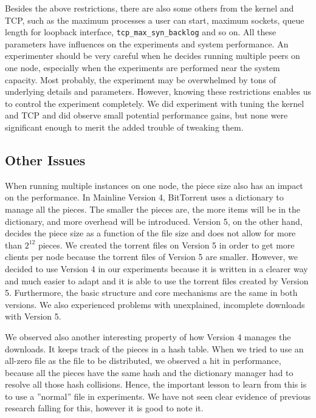 \documentclass[10pt,letterpaper,twocolumn]{article}
\begin{document}
Besides the above restrictions, there are also some others from the
kernel and TCP, such as the maximum processes a user can start,
maximum sockets, queue length for loopback interface,
\texttt{tcp\_max\_syn\_backlog} and so on. All these parameters have influences
on the experiments and system performance. An experimenter should be
very careful when he decides running multiple peers on one node,
especially when the experiments are performed near the system
capacity. Most probably, the experiment may be overwhelmed by tons of
underlying details and parameters. However, knowing these restrictions
enables us to control the experiment completely. We did experiment
with tuning the kernel and TCP and did observe small potential
performance gains, but none were significant enough to merit the added
trouble of tweaking them.






\subsection{Other Issues}
\label{sec:other-issues}


When running multiple instances on one node, the piece size also has
an impact on the performance. In Mainline Version 4, BitTorrent uses a
dictionary to manage all the pieces. The smaller the pieces are, the
more items will be in the dictionary, and more overhead will be
introduced. Version 5, on the other hand, decides the piece size as a
function of the file size and does not allow for more than $2^{12}$
pieces. We created the torrent files on Version 5 in order to get more
clients per node because the torrent files of Version 5 are
smaller. However, we decided to use Version 4 in our experiments
because it is written in a clearer way and much easier to adapt and it
is able to use the torrent files created by Version 5. Furthermore,
the basic structure and core mechanisms are the same in both
versions. We also experienced problems with unexplained, incomplete
downloads with Version 5.















We observed also another interesting property of how Version 4 manages
the downloads. It keeps track of the pieces in a hash table. When we
tried to use an all-zero file as the file to be distributed, we
observed a hit in performance, because all the pieces have the same
hash and the dictionary manager had to resolve all those hash
collisions. Hence, the important lesson to learn from this is to use a
''normal'' file in experiments. We have not seen clear evidence of
previous research falling for this, however it is good to note it.
\end{document}
